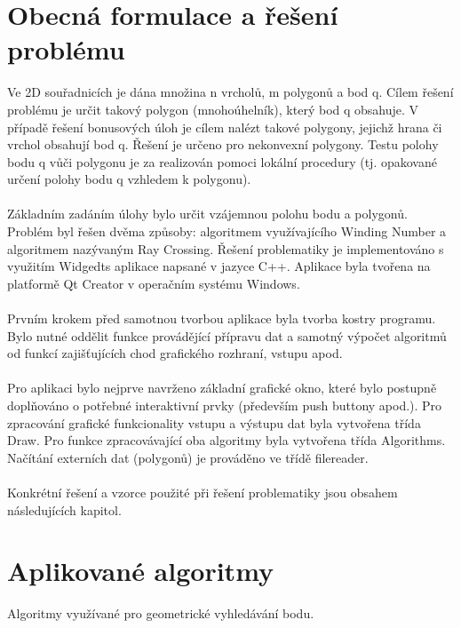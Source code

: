 \documentclass[a4paper, 12pt]{article}
\begin{document}
\section{Obecná formulace a řešení problému}
Ve 2D souřadnicích je dána množina n vrcholů, m polygonů a bod q.
Cílem řešení problému je určit takový polygon (mnohoúhelník), který bod q obsahuje. V případě
řešení bonusových úloh je cílem nalézt takové polygony, jejichž hrana či vrchol obsahují bod q.
Řešení je určeno pro nekonvexní polygony. Testu polohy bodu q vůči polygonu je za realizován pomoci
lokální procedury (tj. opakované určení polohy bodu q vzhledem k polygonu).\\
\\
Základním zadáním úlohy bylo určit vzájemnou polohu bodu a polygonů. Problém byl řešen dvěma
způsoby: algoritmem využívajícího Winding Number a algoritmem nazývaným Ray Crossing. Řešení
problematiky je implementováno s využitím Widgedts aplikace napsané v jazyce C++. Aplikace byla
tvořena na platformě Qt Creator v operačním systému Windows.\\
\\
Prvním krokem před samotnou tvorbou aplikace byla tvorba kostry programu. Bylo nutné oddělit
funkce provádějící přípravu dat a samotný výpočet algoritmů od funkcí zajišťujících chod grafického
rozhraní, vstupu apod.\\
\\
Pro aplikaci bylo nejprve navrženo základní grafické okno, které bylo postupně doplňováno o
potřebné interaktivní prvky (především push buttony apod.). Pro zpracování grafické funkcionality vstupu a výstupu dat byla vytvořena třída Draw. Pro funkce zpracovávající oba algoritmy byla vytvořena třída Algorithms. Načítání externích dat (polygonů) je prováděno ve třídě filereader.\\
\\
Konkrétní řešení a vzorce použité při řešení problematiky jsou obsahem následujících kapitol.

\section{Aplikované algoritmy}
Algoritmy využívané pro geometrické vyhledávání bodu.
\end{document}
